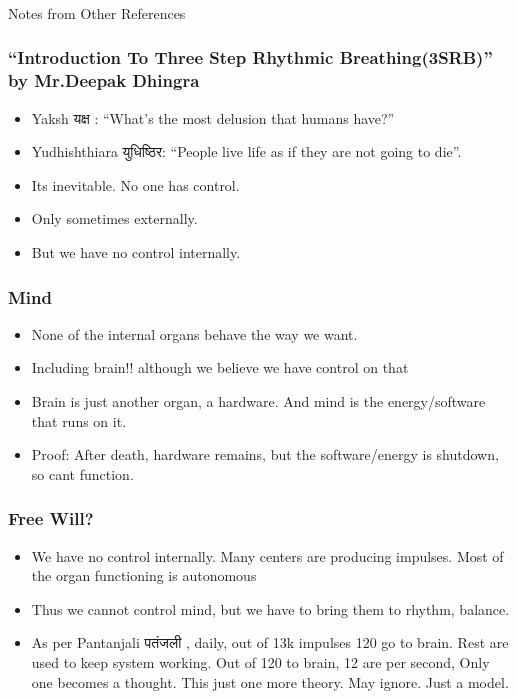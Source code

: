 \begin{frame}[fragile]\frametitle{}
\begin{center}
{\Large Notes from Other References}
\end{center}
\end{frame}


\begin{frame}[fragile]
\frametitle{``Introduction To Three Step Rhythmic Breathing(3SRB)'' by Mr.Deepak Dhingra}


\begin{itemize}
\item Yaksh यक्ष   : ``What's the most delusion that humans have?''
\item Yudhishthiara युधिष्ठिर: ``People live life as if they are not going to die''.
\item Its inevitable. No one has control. 
\item Only sometimes externally.
\item But we have no control internally. 
\end{itemize}
\end{frame}


\begin{frame}[fragile]
\frametitle{Mind}
\begin{itemize}
\item None of the internal organs behave the way we want. 
\item Including brain!! although we believe we have control on that
\item Brain is just another organ, a hardware. And mind is the energy/software that runs on it.
\item Proof: After death, hardware remains, but the software/energy is shutdown, so cant function.
\end{itemize}
\end{frame}



\begin{frame}[fragile]
\frametitle{Free Will?}

\begin{itemize}
\item We have no control internally. Many centers are producing impulses. Most of the organ functioning is autonomous
\item Thus we cannot control mind, but we have to bring them to rhythm, balance.
\item As per Pantanjali पतंजली , daily, out of 13k impulses 120 go to brain. Rest are used to keep system working. Out of 120 to brain, 12 are per second, Only one becomes a thought. This just one more theory. May ignore. Just a model.
\end{itemize}
\end{frame}

